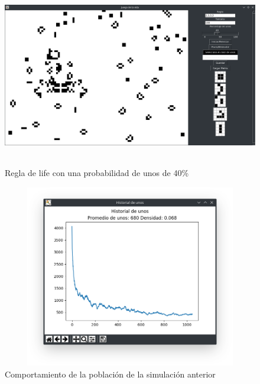 \begin{figure}[H]
\begin{center}
 \includegraphics[width=12cm, height=8cm]{./img/life40.png}
 \caption{Regla de life con una probabilidad de unos de 40\%}
 \label{fig:life40}
\end{center}
\end{figure}

\begin{figure}[H]
\begin{center}
 \includegraphics[width=12cm, height=8cm]{./img/life40grafica.png}
 \caption{Comportamiento de la población de la simulación anterior}
 \label{fig:life40grafica}
\end{center}
\end{figure}

